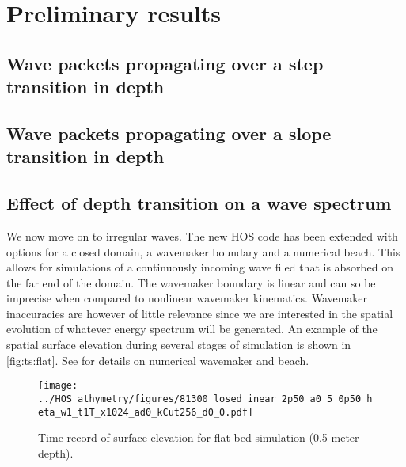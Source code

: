 \documentclass[internal]{sintefmemo}
\renewcommand{\_}[1]{_\mr{#1}}
\begin{document}
\section{Preliminary results}
\label{sec:results}

\subsection{Wave packets propagating over a step transition in depth}
\label{sec:results:step}
 

\subsection{Wave packets propagating over a slope transition in depth}
\label{sec:results:slope}



\subsection{Effect of depth transition on a wave spectrum}
\label{sec:results:spectrum}
We now move on to irregular waves.
The new HOS code has been extended with options for a closed domain, a wavemaker boundary and a numerical beach. 
This allows for simulations of a continuously incoming wave filed that is absorbed on the far end of the domain. 
The wavemaker boundary is linear and can so be imprecise when compared to nonlinear wavemaker kinematics. 
Wavemaker inaccuracies are however of little relevance since we are interested in the spatial evolution of whatever energy spectrum will be generated. 
An example of the spatial surface elevation during several stages of simulation is shown in \autoref{fig:ts:flat}.
See \citet{SFo2018_HOS,bonnefoy2010,bonnefoy2006A_BM,ducrozet2006_BM} for details on numerical wavemaker and beach.
\\




\begin{figure}[H]%
\centering
\texttt{[image: ../HOS\_bathymetry/figures/81300\_closed\_linear\_T2p50\_ka0\_M5\_H0p50\_theta\_Nw1\_dt1T\_nx1024\_pad0\_ikCut256\_Md0\_r0.pdf]}%
\caption{Time record of surface elevation for flat bed simulation (0.5 meter depth).}%
\label{fig:ts:flat}%
\end{figure}
\end{document}

